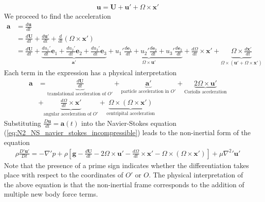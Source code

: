 \documentclass[a4paper, 12pt]{article}
\numberwithin{equation}{subsubsection}
\begin{document}
\begin{align}
	\mathbf{u} = \mathbf{U} + \mathbf{u}' + \Omega \times \mathbf{x}'
\end{align}
We proceed to find the acceleration
\begin{align*}
	\mathbf{a} &= \frac{d \mathbf{u}}{dt} \\
	&= \frac{d \mathbf{U}}{dt} + \frac{d\mathbf{u}'}{dt} + \frac{d}{dt}(\Omega \times \mathbf{x}') \\
	&= \frac{d \mathbf{U}}{dt} + \underbrace{\frac{du_1'}{dt} \mathbf{e}_1 + \frac{du_2'}{dt} \mathbf{e}_2 + \frac{du_3'}{dt} \mathbf{e}_3}_{\mathbf{a}'} + \underbrace{u_1' \frac{d \mathbf{e}_1}{dt} + u_2' \frac{d \mathbf{e}_2}{dt} + u_3' \frac{d \mathbf{e}_3}{dt}}_{\Omega \times \mathbf{u}'} + \frac{d \Omega}{dt} \times \mathbf{x}' + \underbrace{\Omega \times \frac{d \mathbf{x}'}{dt}}_{\Omega \times \left(\mathbf{u}' + \Omega \times \mathbf{x}'\right)}
\end{align*}
Each term in the expression has a physical interpretation
\begin{align}
	\mathbf{a} &= \underbrace{\frac{d \mathbf{U}}{dt}}_\text{translational acceleration of $O'$} + \underbrace{\mathbf{a}'}_\text{particle acceleration in $O'$} + \underbrace{2 \Omega \times \mathbf{u}'}_\text{Coriolis acceleration} \\
	&+ \underbrace{\frac{d \Omega}{dt} \times \mathbf{x}'}_\text{angular acceleration of $O'$} + \underbrace{\Omega \times (\Omega \times \mathbf{x}')}_\text{centripital acceleration}
\end{align}
Substituting $\frac{D \mathbf{u}}{d t} = \mathbf{a}(t)$ into the Navier-Stokes equation (\ref{eq:N2_NS_navier_stokes_incompressible}) leads to the non-inertial form of the equation
\begin{align}
	\rho \frac{D' \mathbf{u}'}{D t} = - \nabla' p + \rho \left[ \mathbf{g} - \frac{d \mathbf{U}}{dt} - 2 \Omega \times \mathbf{u}' - \frac{d\Omega}{d t} \times \mathbf{x}' - \Omega \times (\Omega \times \mathbf{x}')\right] + \mu {\nabla^2} ' \mathbf{u}' \label{eq:N2_NS_navier_stokes_incompressible_noninertial}
\end{align}
Note that the presence of a prime sign indicates whether the differentiation takes place with respect to the coordinates of $O'$ or $O$. The physical interpretation of the above equation is that the non-inertial frame corresponds to the addition of multiple new body force terms.
\end{document}
